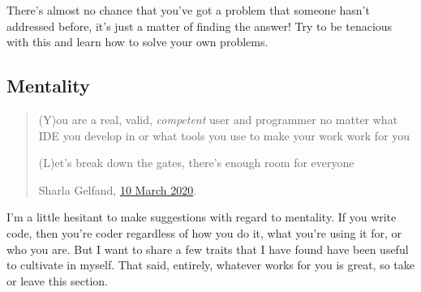 \documentclass[
]{book}
\begin{document}
There's almost no chance that you've got a problem that someone hasn't addressed before, it's just a matter of finding the answer! Try to be tenacious with this and learn how to solve your own problems.

\hypertarget{mentality}{%
\subsection{Mentality}\label{mentality}}

\begin{quote}
(Y)ou are a real, valid, \emph{competent} user and programmer no matter what IDE you develop in or what tools you use to make your work work for you

(L)et's break down the gates, there's enough room for everyone

Sharla Gelfand, \href{https://twitter.com/sharlagelfand/status/1237365576701542400}{10 March 2020}.
\end{quote}

I'm a little hesitant to make suggestions with regard to mentality. If you write code, then you're coder regardless of how you do it, what you're using it for, or who you are. But I want to share a few traits that I have found have been useful to cultivate in myself. That said, entirely, whatever works for you is great, so take or leave this section.
\end{document}
